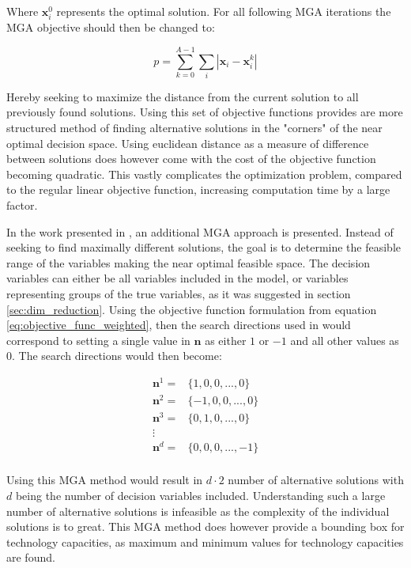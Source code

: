 Where $\mathbf{x}_i^0$ represents the optimal solution. For all following MGA iterations the MGA objective should then be changed to:

\begin{equation}\label{eq:MGA_max_diff_2}
p = \sum_{k=0}^{A-1} \sum_i |\mathbf{x}_i - \mathbf{x}_i^k|
\end{equation}

Hereby seeking to maximize the distance from the current solution to all previously found solutions. Using this set of objective functions provides are more structured method of finding alternative solutions in the "corners" of the near optimal decision space. Using euclidean distance as a measure of difference between solutions does however come with the cost of the objective function becoming quadratic. This vastly complicates the optimization problem, compared to the regular linear objective function, increasing computation time by a large factor. 

In the work presented in \cite{Fabian_MGA}, an additional MGA approach is presented. Instead of seeking to find maximally different solutions, the goal is to determine the feasible range of the variables making the near optimal feasible space. The decision variables can either be all variables included in the model, or variables representing groups of the true variables, as it was suggested in section \ref{sec:dim_reduction}. Using the objective function formulation from equation \ref{eq:objective_func_weighted}, then the search directions used in \cite{Fabian_MGA} would correspond to setting a single value in $\mathbf{n}$ as either $1$ or $-1$ and all other values as $0$. The search directions would then become:

\begin{equation*}
	\begin{split}
		\mathbf{n}^1 =& \{1,0,0,...,0  \} \\
		\mathbf{n}^2 =& \{-1,0,0,...,0  \} \\
		\mathbf{n}^3 =& \{0,1,0,...,0  \} \\
		\vdots& \\
		\mathbf{n}^d =& \{0,0,0,...,-1  \} \\
	\end{split}
\end{equation*}

Using this MGA method would result in $d\cdot2$ number of alternative solutions with $d$ being the number of decision variables included. Understanding such a large number of alternative solutions is infeasible as the complexity of the individual solutions is to great. This MGA method does however provide a bounding box for technology capacities, as maximum and minimum values for technology capacities are found. 

